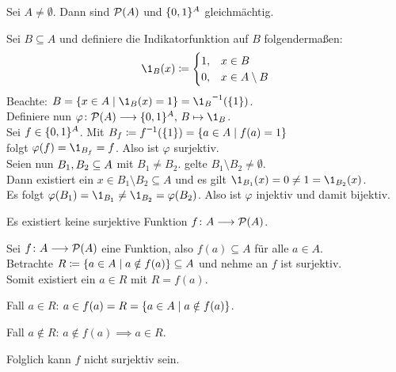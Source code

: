 \documentclass[../ana1.tex]{subfiles}
\begin{document}
\begin{lem}\label{satz:bij_pow}
	Sei \(A \neq \emptyset \). Dann sind \( \mathcal{P}(A) \) und \(\{0 , 1\}^A \) gleichmächtig.
\end{lem}
\begin{bew}
	Sei \(B \subseteq A \) und definiere die Indikatorfunktion auf \(B \) folgendermaßen:
	\[ \1_B(x) \coloneqq \begin{cases}
			1 \ko & x \in B \\
			0 \ko & x \in A \setminus B
		\end{cases}\]
	Beachte: \(B = \set{x \in A \; | \; \1_B(x) = 1 } = \inverse{\1_B}(\set{1}) \). \\
	Definiere nun \( \varphi \colon \PO(A) \longrightarrow \set{0 \ko 1}^A \ko \, B \mapsto \1_B \). \\
	Sei \(f \in \{0 , 1\}^A \). Mit \(B_f \coloneqq \inverse{f}(\set{1}) = \set{a \in A \; \vert \; f(a) = 1} \) \\
	folgt \(\varphi(f) = \1_{B_f} = f \). Also ist \(\varphi \) surjektiv. \\
	Seien nun \(B_1 , B_2 \subseteq A \) mit \(B_1 \neq B_2 \). \obda{} gelte \(B_1 \setminus B_2 \neq \emptyset \). \\
	Dann existiert ein \(x \in B_1 \setminus B_2 \subseteq A \) und es gilt \(\1_{B_1}(x) = 0 \neq 1 = \1_{B_2}(x) \). \\
	Es folgt \(\varphi(B_1) = \1_{B_1} \neq \1_{B_2} = \varphi(B_2) \). Also ist \(\varphi \) injektiv und damit bijektiv.
\end{bew}

\begin{lem}
	Es existiert keine surjektive Funktion \(f \colon A \longrightarrow \mathcal{P}(A) \).
\end{lem}
\begin{bew}
	Sei \(f \colon A \longrightarrow \mathcal{P}(A) \) eine Funktion, also \(f(a) \subseteq A \) für alle \(a \in A \). \\
	Betrachte \(R \coloneqq \{a \in A \; \vert \; a \notin f(a)\} \subseteq A \) und nehme an \(f \)  ist surjektiv. \\
	Somit existiert ein \(a \in R \) mit \(R = f(a)\).
	\begin{faelle}
		\item[Fall \(a \in R \):] \(a \in f(a) = R =  \{a \in A \; \vert \; a \notin f(a)\} \). \Lightning{}
		\item[Fall \(a \notin R\):] \(a \notin f(a) \implies a \in R \). \Lightning{} 
	\end{faelle}
	Folglich kann \(f \) nicht surjektiv sein.
\end{bew}

\end{document}
